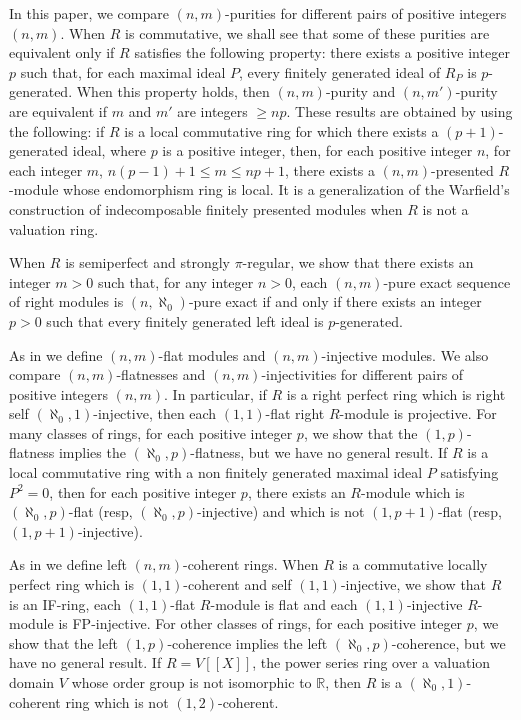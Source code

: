 \documentclass{amsart}
\begin{document}
In this paper, we  compare $(n,m)$-purities for different pairs of positive integers $(n,m)$. When $R$ is commutative, we shall see that some of these purities are  equivalent only if $R$  satisfies the following property: there exists a positive integer $p$ such that, for each maximal ideal $P$, every finitely generated ideal of $R_P$ is $p$-generated. When this property holds, then  $(n,m)$-purity and  $(n,m')$-purity are equivalent if $m$ and $m'$ are integers $\geq np$. These results are obtained by using the following: if $R$ is a local commutative ring for which there exists a $(p+1)$-generated ideal, where $p$ is a positive integer, then, for each positive integer $n$,  for each integer $m$, $n(p-1)+1\leq m\leq np+1$, there exists a $(n,m)$-presented $R$-module whose endomorphism ring is local. It is a generalization of the Warfield's construction of indecomposable finitely presented modules when $R$ is not a valuation ring. 

When $R$ is semiperfect and strongly $\pi$-regular, we show that there exists an integer $m>0$ such that, for any integer $n>0$, each $(n,m)$-pure exact sequence of right modules is $(n,\aleph_0)$-pure exact if and only if there exists an integer $p>0$ such that every finitely generated left ideal is $p$-generated.

As in \cite{ZhChZh05} we define $(n,m)$-flat modules and $(n,m)$-injective modules. We also compare $(n,m)$-flatnesses and $(n,m)$-injectivities for different pairs of positive integers $(n,m)$. In particular, if $R$ is a right perfect ring which is right self $(\aleph_0,1)$-injective, then each $(1,1)$-flat right $R$-module is projective. For many classes of rings, for each positive integer $p$, we show that the $(1,p)$-flatness implies the $(\aleph_0,p)$-flatness, but we have no general result. If $R$ is a local commutative ring with a non finitely generated maximal ideal $P$ satisfying $P^2=0$, then for each positive integer $p$, there exists an $R$-module which is $(\aleph_0,p)$-flat (resp, $(\aleph_0,p)$-injective)  and which is not $(1,p+1)$-flat (resp, $(1,p+1)$-injective). 

As in \cite{ZhChZh05} we define left $(n,m)$-coherent rings. When $R$ is a commutative locally perfect ring which is $(1,1)$-coherent and self $(1,1)$-injective, we show that $R$ is an IF-ring, each $(1,1)$-flat $R$-module is flat and each $(1,1)$-injective $R$-module is FP-injective. For other classes of rings, for each positive integer $p$, we show that the left $(1,p)$-coherence implies the left $(\aleph_0,p)$-coherence, but we have no general result. If $R=V[[X]]$, the power series ring over  a valuation domain $V$ whose order group is not isomorphic to $\mathbb{R}$, then $R$ is a $(\aleph_0,1)$-coherent ring which is not $(1,2)$-coherent.
\end{document}
